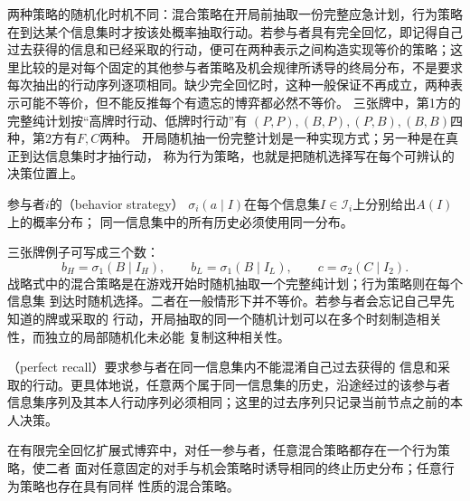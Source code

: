 两种策略的随机化时机不同：混合策略在开局前抽取一份完整应急计划，行为策略在到达某个信息集时才按该处概率抽取行动。若参与者具有完全回忆，即记得自己过去获得的信息和已经采取的行动，便可在两种表示之间构造实现等价的策略；这里比较的是对每个固定的其他参与者策略及机会规律所诱导的终局分布，不是要求每次抽出的行动序列逐项相同。缺少完全回忆时，这种一般保证不再成立，两种表示可能不等价，但不能反推每个有遗忘的博弈都必然不等价。
三张牌中，第1方的完整纯计划按“高牌时行动、低牌时行动”有
\((P,P),(B,P),(P,B),(B,B)\)四种，第2方有\(F,C\)两种。
开局随机抽一份完整计划是一种实现方式；另一种是在真正到达信息集时才抽行动，
称为行为策略，也就是把随机选择写在每个可辨认的决策位置上。
\begin{definition}[行为策略]
\label{def:game-behavior-strategy}
参与者\(i\)的（behavior strategy）
\(\sigma_i(a\mid I)\)在每个信息集\(I\in\mathcal{I}_i\)上分别给出$A(I)$上的概率分布；
同一信息集中的所有历史必须使用同一分布。
\end{definition}
三张牌例子可写成三个数：
\[
  b_H=\sigma_1(B\mid I_H),\qquad
  b_L=\sigma_1(B\mid I_L),\qquad
  c=\sigma_2(C\mid I_2).
\]
战略式中的混合策略是在游戏开始时随机抽取一个完整纯计划；行为策略则在每个信息集
到达时随机选择。二者在一般情形下并不等价。若参与者会忘记自己早先知道的牌或采取的
行动，开局抽取的同一个随机计划可以在多个时刻制造相关性，而独立的局部随机化未必能
复制这种相关性。

\begin{definition}[完全回忆]
\label{def:game-perfect-recall}
（perfect recall）要求参与者在同一信息集内不能混淆自己过去获得的
信息和采取的行动。更具体地说，任意两个属于同一信息集的历史，沿途经过的该参与者
信息集序列及其本人行动序列必须相同；这里的过去序列只记录当前节点之前的本人决策。
\end{definition}

\begin{theorem}[Kuhn实现等价]
\label{thm:game-kuhn-equivalence}
在有限完全回忆扩展式博弈中，对任一参与者，任意混合策略都存在一个行为策略，使二者
面对任意固定的对手与机会策略时诱导相同的终止历史分布；任意行为策略也存在具有同样
性质的混合策略。
\end{theorem}

